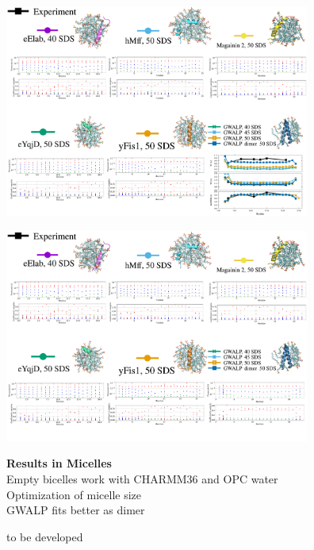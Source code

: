 \documentclass{beamer}
\begin{document}
\addtocounter{framenumber}{-1}
\begin{frame}
\begin{center}


\vspace{0.5cm}


\includegraphics[height=7cm]{all_pep13.pdf}
\end{center}
\end{frame}


\addtocounter{framenumber}{-1}
\begin{frame}
\begin{center}


\vspace{0.5cm}


\includegraphics[height=7cm]{all_pep14.pdf}
\end{center}
\end{frame}


\begin{frame}
\LARGE{\centering
\textbf{Results in Micelles} \\
Empty bicelles work with CHARMM36 and OPC water \\
Optimization of micelle size\\
GWALP fits better as dimer\\


\vspace{1.5cm}

to be developed
}


\end{frame}
\end{document}

